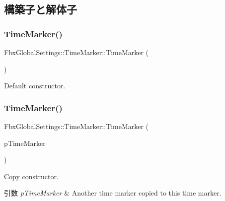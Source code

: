 \subsection{構築子と解体子}
\mbox{\label{struct_fbx_global_settings_1_1_time_marker_a6d04ed8237bfea2a942a9d25195c08f8}} 
\subsubsection{\texorpdfstring{Time\+Marker()}{TimeMarker()}\hspace{0.1cm}{\footnotesize\ttfamily [1/2]}}
{\footnotesize\ttfamily Fbx\+Global\+Settings\+::\+Time\+Marker\+::\+Time\+Marker (\begin{DoxyParamCaption}{ }\end{DoxyParamCaption})}



Default constructor. 

\mbox{\label{struct_fbx_global_settings_1_1_time_marker_a6fc55ef604d2093fc58471963e7dba8d}} 
\subsubsection{\texorpdfstring{Time\+Marker()}{TimeMarker()}\hspace{0.1cm}{\footnotesize\ttfamily [2/2]}}
{\footnotesize\ttfamily Fbx\+Global\+Settings\+::\+Time\+Marker\+::\+Time\+Marker (\begin{DoxyParamCaption}\item[{const \hyperlink{struct_fbx_global_settings_1_1_time_marker}{Time\+Marker} \&}]{p\+Time\+Marker }\end{DoxyParamCaption})}

Copy constructor. 
\begin{DoxyParams}{引数}
{\em p\+Time\+Marker} & Another time marker copied to this time marker. \\
\hline
\end{DoxyParams}


